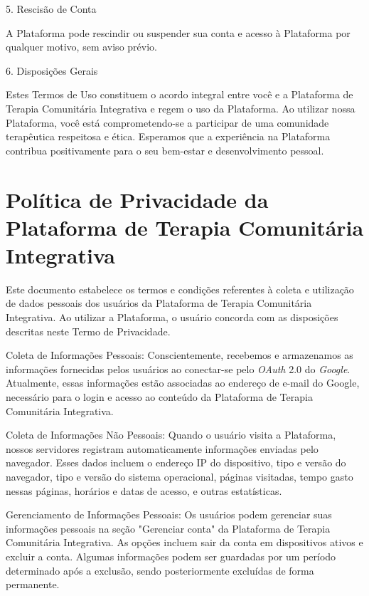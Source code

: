 \begin{apendicesenv}
        5. Rescisão de Conta
        
        A Plataforma pode rescindir ou suspender sua conta e acesso à Plataforma por qualquer motivo, sem aviso prévio.
        
        6. Disposições Gerais
        
        Estes Termos de Uso constituem o acordo integral entre você e a Plataforma de Terapia Comunitária Integrativa e regem o uso da Plataforma. Ao utilizar nossa Plataforma, você está comprometendo-se a participar de uma comunidade terapêutica respeitosa e ética. Esperamos que a experiência na Plataforma contribua positivamente para o seu bem-estar e desenvolvimento pessoal.

    \chapter{{P}olítica de Privacidade da Plataforma de Terapia Comunitária Integrativa}
    \label{appendix:Política de Privacidade}
        Este documento estabelece os termos e condições referentes à coleta e utilização de dados pessoais dos usuários da Plataforma de Terapia Comunitária Integrativa. Ao utilizar a Plataforma, o usuário concorda com as disposições descritas neste Termo de Privacidade.
    
        Coleta de Informações Pessoais:
        Conscientemente, recebemos e armazenamos as informações fornecidas pelos usuários ao conectar-se pelo \textit{OAuth} 2.0 do \textit{Google}. Atualmente, essas informações estão associadas ao endereço de e-mail do Google, necessário para o login e acesso ao conteúdo da Plataforma de Terapia Comunitária Integrativa.
        
        Coleta de Informações Não Pessoais:
        Quando o usuário visita a Plataforma, nossos servidores registram automaticamente informações enviadas pelo navegador. Esses dados incluem o endereço IP do dispositivo, tipo e versão do navegador, tipo e versão do sistema operacional, páginas visitadas, tempo gasto nessas páginas, horários e datas de acesso, e outras estatísticas.
        
        Gerenciamento de Informações Pessoais:
        Os usuários podem gerenciar suas informações pessoais na seção "Gerenciar conta" da Plataforma de Terapia Comunitária Integrativa. As opções incluem sair da conta em dispositivos ativos e excluir a conta. Algumas informações podem ser guardadas por um período determinado após a exclusão, sendo posteriormente excluídas de forma permanente.
        

\end{apendicesenv}
